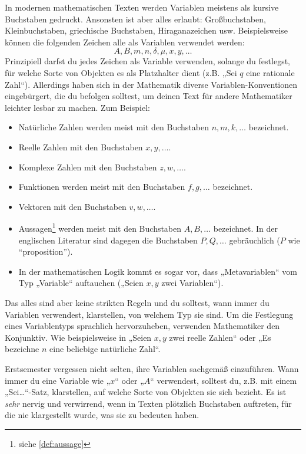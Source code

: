 \begin{nota}
    In modernen mathematischen Texten werden Variablen meistens als kursive Buchstaben gedruckt. Ansonsten ist aber alles erlaubt: Großbuchstaben, Kleinbuchstaben, griechische Buchstaben, Hiraganazeichen usw. Beispielsweise können die folgenden Zeichen alle als Variablen verwendet werden:
        \[ A,B,m,n,\delta,\mu, x,y,\dots \]
    Prinzipiell darfst du jedes Zeichen als Variable verwenden, solange du festlegst, für welche Sorte von Objekten es als Platzhalter dient (z.B. „Sei $q$ eine rationale Zahl“). Allerdings haben sich in der Mathematik diverse Variablen-Konventionen eingebürgert, die du befolgen solltest, um deinen Text für andere Mathematiker leichter lesbar zu machen. Zum Beispiel:
    \begin{itemize}
        \item Natürliche Zahlen werden meist mit den Buchstaben $n,m,k,\dots$ bezeichnet.
        \item Reelle Zahlen mit den Buchstaben $x,y,\dots$.
        \item Komplexe Zahlen mit den Buchstaben $z,w,\dots$.
        \item Funktionen werden meist mit den Buchstaben $f,g,\dots$ bezeichnet.
        \item Vektoren mit den Buchstaben $v,w,\dots$.
        \item Aussagen\footnote{siehe \cref{def:aussage}} werden meist mit den Buchstaben $A,B,\dots$ bezeichnet. In der englischen Literatur sind dagegen die Buchstaben $P,Q,\dots$ gebräuchlich ($P$ wie ``proposition'').
        \item In der mathematischen Logik kommt es sogar vor, dass „Metavariablen“ vom Typ „Variable“ auftauchen („Seien $x,y$ zwei Variablen“).
    \end{itemize}
    Das alles sind aber keine strikten Regeln und du solltest, wann immer du Variablen verwendest, klarstellen, von welchem Typ sie sind. Um die Festlegung eines Variablentyps sprachlich hervorzuheben, verwenden Mathematiker den Konjunktiv. Wie beispielsweise in „Seien $x,y$ zwei reelle Zahlen“ oder „Es bezeichne $n$ eine beliebige natürliche Zahl“.
\end{nota}


\begin{bem}
    Erstsemester vergessen nicht selten, ihre Variablen sachgemäß einzuführen. Wann immer du eine Variable wie „$x$“ oder „$A$“ verwendest, solltest du, z.B. mit einem „Sei\dots“-Satz, klarstellen, auf welche Sorte von Objekten sie sich bezieht. Es ist \emph{sehr} nervig und verwirrend, wenn in Texten plötzlich Buchstaben auftreten, für die nie klargestellt wurde, was sie zu bedeuten haben.
\end{bem}


